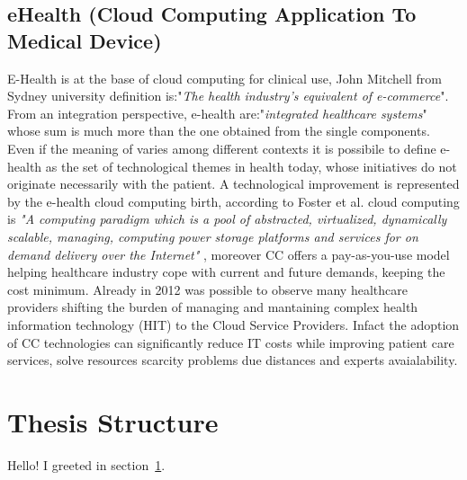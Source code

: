 \subsection{eHealth (Cloud Computing Application To Medical Device)}
E-Health is at the base of cloud computing for clinical use, John Mitchell from Sydney university definition is:"\textit{The health industry's equivalent of e-commerce}". From an integration perspective, e-health are:"\textit{integrated healthcare systems}" whose sum is much more than the one obtained from the single components. Even if the meaning of  varies among different contexts \cite{Eysenbach} it is possibile to define e-health as the set of technological themes in health today, whose initiatives do not originate necessarily with the patient. \cite{oh}\cite{DellaMea}
A technological improvement is represented by the e-health cloud computing birth, according to Foster et al. cloud computing is \textit{"A computing paradigm which is a pool of abstracted, virtualized, dynamically scalable, managing, computing power storage platforms and services  for on demand delivery over the Internet"} \cite{foster}, moreover CC offers a pay-as-you-use model helping healthcare industry cope with current and future demands, keeping the cost minimum. \cite{AbuKhousa}
Already in 2012 was possible to observe many healthcare providers shifting the burden of managing and mantaining complex health information technology (HIT) to the Cloud Service Providers. \cite{foster}
Infact the adoption of CC technologies can significantly reduce IT costs while improving patient care services, solve resources scarcity problems due distances and experts avaialability. \cite{AbuKhousa}

\section{Thesis Structure}
\label{sec:greetings}

Hello!
I greeted in section~\ref{sec:greetings}.